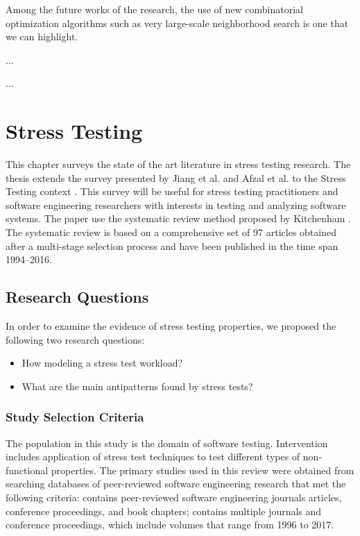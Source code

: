 \documentclass[espaco=umemeio,chapter=TITLE,twoside,openright]{abnt}
\begin{document}
Among the future works of the research, the use of new combinatorial optimization algorithms such as very large-scale neighborhood search is one that we can highlight.

...
\appendix

...



\chapter{Stress Testing}


This chapter surveys the state of the art literature in stress testing research. The thesis extends the survey presented by Jiang et al. \cite{Jiang2010}  and Afzal et al. \cite{Afzal2009a} to the Stress Testing context .  This survey will be useful for stress testing practitioners and software engineering researchers with interests in testing and analyzing software systems. The paper use the systematic review method proposed by Kitchenham \cite{Kitchenham2007}. The systematic review is based on a comprehensive set of 97 articles obtained after a multi-stage selection process and have been published in the time span 1994–2016.


\section{Research Questions}

In order to examine the evidence of stress testing properties, we proposed the following two research questions:


\begin{itemize}
\item How modeling a stress test workload?
\item What are the main antipatterns found by stress tests?
\end{itemize}


\subsection{Study Selection Criteria}

The population in this study is the domain of software testing. Intervention includes application of stress test techniques to test different types of non-functional properties. The primary studies used in this review were obtained from
searching databases of peer-reviewed software engineering research that met the following criteria: contains peer-reviewed software engineering journals articles, conference proceedings, and book chapters; contains multiple journals and conference proceedings,
which include volumes that range from 1996 to 2017.
\end{document}
